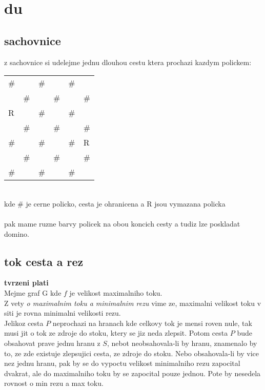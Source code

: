 \documentclass[a4paper]{article}
\begin{document}
\pagestyle{fancy}

\setcounter{section}{2}
\section{du}
\subsection{sachovnice}
z sachovnice si udelejme jednu dlouhou cestu ktera prochazi kazdym polickem:\\
\begin{tabular}{|l|l|l|l|l|l|}
\hline
\multicolumn{1}{|l}{\#} & \multicolumn{1}{l}{} & \multicolumn{1}{l}{\#} &
\multicolumn{1}{l}{} & \multicolumn{1}{l}{\#} & \\
\cline{2-5}
& \multicolumn{1}{l}{\#} & & \multicolumn{1}{l}{\#} & & \# \\
R & & \# & & \# & \\
& \# & & \# & & \# \\
\# & & \# & & \# & R \\
& \# & & \# & & \# \\
\multicolumn{1}{|l}{\#} & & \multicolumn{1}{l}{\#} & & \multicolumn{1}{l}{\#} &
\\
\hline
\end{tabular}\\
kde \# je cerne policko, cesta je ohranicena a R jsou vymazana policka\\
\\
pak mame ruzne barvy policek na obou koncich cesty a tudiz lze poskladat domino.


\subsection{tok cesta a rez}
\textbf{tvrzeni plati}\\
Mejme graf G kde $f$ je velikost maximalniho toku.\\
Z vety \textit{o maximalnim toku a minimalnim rezu} vime ze,
maximalni velikost toku v siti je rovna minimalni velikosti rezu.\\
Jelikoz cesta $P$ neprochazi na hranach kde celkovy tok je mensi roven nule,
tak musi jit o tok ze zdroje do stoku, ktery se jiz neda zlepsit. 
Potom cesta $P$ bude obsahovat prave jednu hranu z $S$, nebot
neobsahovala-li by hranu, znamenalo by to, ze zde existuje zlepsujici cesta,
ze zdroje do stoku. Nebo obsahovala-li by vice nez jednu hranu, pak
by se do vypoctu velikost minimalniho rezu zapocital dvakrat, ale 
do maximalniho toku by se zapocital pouze jednou. Pote by nesedela rovnost
o min rezu a max toku.
\end{document}
